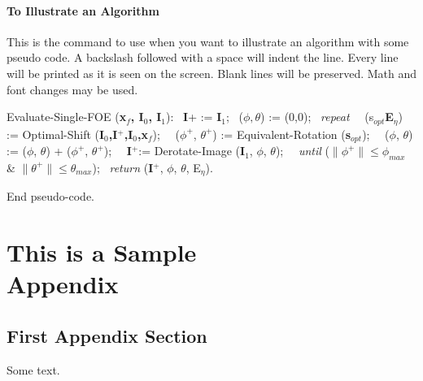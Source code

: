 \subsubsection{To Illustrate an Algorithm}

This is the command to use when you want to illustrate an algorithm
with some pseudo code. A backslash followed with a space will
indent the line. Every line will be printed
as it is seen on the screen. Blank lines will be preserved.
Math and font changes may be used. 


\begin{algorithm}
{\bit Evaluate-Single-FOE} ({\bf x$_f$, I$_0$, I$_1$}):
\ {\bf I}+ := {\bf I}$_1$;
\ ($\phi,\theta$) := (0,0);
\ {\it repeat}
\ \ (s$_{opt}${\bf E}$_\eta$) := {\bit Optimal-Shift} ({\bf I$_0$,I$^+$,I$_0$,x$_f$});
\ \ ($\phi^+$, $\theta^+$) := {\bit Equivalent-Rotation} ({\bf s}$_{opt}$);
\ \ ($\phi$, $\theta$) := ($\phi$, $\theta$) + ($\phi^+$, $\theta^+$);
\ \ {\bf I}$^+$:= {\bit Derotate-Image} ({\bf I}$_1$, $\phi$, $\theta$);
\ \ {\it until} ($\|\phi^+\|\leq\phi_{max}$ \& $\|\theta^+\|\leq\theta_{max}$);
\ {\it return} ({\bf I}$^+$, $\phi$, $\theta$, E$_\eta$).

End pseudo-code.
\end{algorithm}


\appendix


\chapter{This is a Sample\\ Appendix}
\section{First Appendix Section}
Some text.

\chapter{} %
